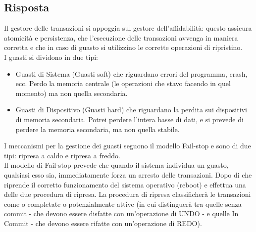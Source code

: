 \documentclass{article}
\begin{document}
\subsection*{Risposta}
Il gestore delle transazioni si appoggia sul gestore dell'affidabilità: questo assicura atomicità e persistenza, che l'esecuzione delle transazioni avvenga in maniera corretta e che in caso di guasto si utilizzino le corrette operazioni di ripristino.\\
I guasti si dividono in due tipi:
\begin{itemize}
    \item Guasti di Sistema (Guasti soft) che riguardano errori del programma, crash, ecc. Perdo la memoria centrale (le operazioni che stavo facendo in quel momento) ma non quella secondaria.
    \item Guasti di Dispositivo (Guasti hard) che riguardano la perdita sui dispositivi di memoria secondaria. Potrei perdere l'intera basse di dati, e si prevede di perdere la memoria secondaria, ma non quella stabile.
\end{itemize}
I meccanismi per la gestione dei guasti seguono il modello Fail-stop e sono di due tipi: ripresa a caldo e ripresa a freddo.\\
Il modello di Fail-stop prevede che quando il sistema individua un guasto, qualsiasi esso sia, immediatamente forza un arresto delle transazioni. Dopo di che riprende il corretto funzionamento del sistema operativo (reboot) e effettua una delle due procedura di ripresa.
La procedura di ripresa classificherà le transazioni come o completate o potenzialmente attive (in cui distinguerà tra quelle senza commit - che devono essere disfatte con un'operazione di UNDO - e quelle In Commit - che devono essere rifatte con un'operazione di REDO).\\
\end{document}
